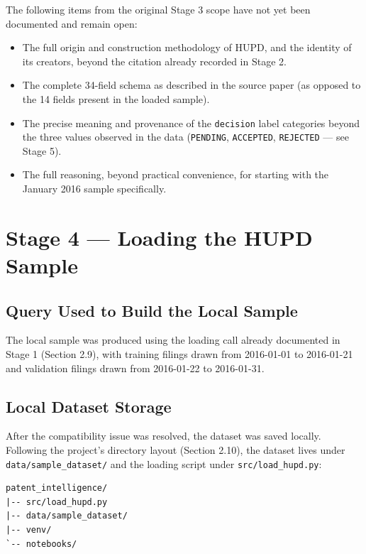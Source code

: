 \documentclass[11pt]{article}
\begin{document}
The following items from the original Stage 3 scope have not yet been documented and remain open:

\begin{itemize}
    \item The full origin and construction methodology of HUPD, and the identity of its creators, beyond the citation already recorded in Stage 2.
    \item The complete 34-field schema as described in the source paper (as opposed to the 14 fields present in the loaded sample).
    \item The precise meaning and provenance of the \texttt{decision} label categories beyond the three values observed in the data (\texttt{PENDING}, \texttt{ACCEPTED}, \texttt{REJECTED} --- see Stage 5).
    \item The full reasoning, beyond practical convenience, for starting with the January 2016 sample specifically.
\end{itemize}

\section{Stage 4 --- Loading the HUPD Sample}

\subsection{Query Used to Build the Local Sample}
\label{sec:load-hupd-sample-query}

The local sample was produced using the loading call already documented in Stage 1 (Section 2.9), with training filings drawn from 2016-01-01 to 2016-01-21 and validation filings drawn from 2016-01-22 to 2016-01-31.

\subsection{Local Dataset Storage}

After the compatibility issue was resolved, the dataset was saved locally. Following the project's directory layout (Section 2.10), the dataset lives under \texttt{data/sample\_dataset/} and the loading script under \texttt{src/load\_hupd.py}:

\begin{lstlisting}
patent_intelligence/
|-- src/load_hupd.py
|-- data/sample_dataset/
|-- venv/
`-- notebooks/
\end{lstlisting}
\end{document}
